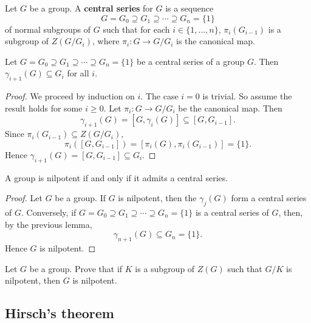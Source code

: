 \begin{definition}
Let $G$ be a group. A \textbf{central series} for $G$ 
is a sequence 
	\[
		G=G_0\supseteq G_1\supseteq\cdots\supseteq G_n=\{1\}
	\]
of normal subgroups of $G$ such that 
for each $i\in\{1,\dots,n\}$, 
$\pi_i(G_{i-1})$ is a subgroup of $Z(G/G_i)$, where  $\pi_i\colon G\to
G/G_i$ is the canonical map.
\end{definition}

\begin{lemma}
\label{lem:central_series}
Let $G=G_0\supseteq G_1\supseteq\cdots\supseteq G_n=\{1\}$ be 
a central series of a group $G$. Then $\gamma_{i+1}(G)\subseteq G_i$ for all $i$.
\end{lemma}

\begin{proof}
We proceed by induction on $i$. The case $i=0$ is trivial. So assume the result holds for some
$i\geq0$. Let  
	$\pi_i\colon G\to
	G/G_i$ be the canonical map. 
	Then  
	\[
	\gamma_{i+1}(G)=[G,\gamma_i(G)]\subseteq [G,G_{i-1}].
	\]
	Since $\pi_i(G_{i-1})\subseteq Z(G/G_{i})$, 
	\[
        \pi_i([G,G_{i-1}])=[\pi_i(G),\pi_i(G_{i-1})]=\{1\}.
        \]
        Hence $\gamma_{i+1}(G)=[G,G_{i-1}]\subseteq G_i$. 
\end{proof}


\begin{theorem}
A group is nilpotent if and only if it admits a central series. 
\end{theorem}

\begin{proof}
Let $G$ be a group. If $G$ is nilpotent, then the $\gamma_j(G)$ form a central series of 
$G$. Conversely, if $G=G_0\supseteq
G_1\supseteq\cdots\supseteq G_n=\{1\}$ is a central series of $G$, 
then, by the previous lemma,  
	\[
	\gamma_{n+1}(G)\subseteq G_n=\{1\}.
	\]
Hence $G$ is nilpotent. 
\end{proof}

\begin{exercise}
\label{xca:nilpotente_central}
Let $G$ be a group. Prove that if $K$ is a subgroup of $Z(G)$ such that 
$G/K$ is nilpotent, then $G$ is nilpotent. 
\end{exercise}

\subsection{Hirsch's theorem}

